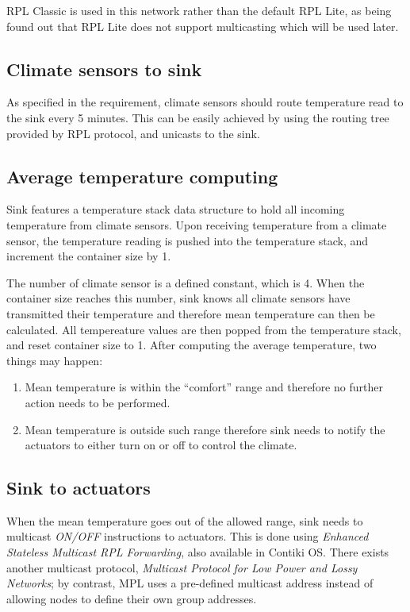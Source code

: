 \documentclass[12pt, oneside, a4paper]{article}
\begin{document}
    RPL Classic is used in this network rather than the default RPL Lite, as being found out that RPL Lite does not support multicasting which will be used later.

    \subsection{Climate sensors to sink}

    As specified in the requirement, climate sensors should route temperature read to the sink every 5 minutes. This can be easily achieved by using the routing tree provided by RPL protocol, and unicasts to the sink.

    \subsection{Average temperature computing}

    Sink features a temperature stack data structure to hold all incoming temperature from climate sensors. Upon receiving temperature from a climate sensor, the temperature reading is pushed into the temperature stack, and increment the container size by 1. 
    
    The number of climate sensor is a defined constant, which is 4. When the container size reaches this number, sink knows all climate sensors have transmitted their temperature and therefore mean temperature can then be calculated. All tempereature values are then popped from the temperature stack, and reset container size to 1. After computing the average temperature, two things may happen:

    \begin{enumerate}[label=\arabic*.]
        \item Mean temperature is within the ``comfort'' range and therefore no further action needs to be performed.
        \item Mean temperature is outside such range therefore sink needs to notify the actuators to either turn on or off to control the climate.
    \end{enumerate}

    \subsection{Sink to actuators}

    When the mean temperature goes out of the allowed range, sink needs to multicast \textit{ON/OFF} instructions to actuators. This is done using \textit{Enhanced Stateless Multicast RPL Forwarding}, also available in Contiki OS. There exists another multicast protocol, \textit{Multicast Protocol for Low Power and Lossy Networks}; by contrast, MPL uses a pre-defined multicast address instead of allowing nodes to define their own group addresses.
\end{document}
